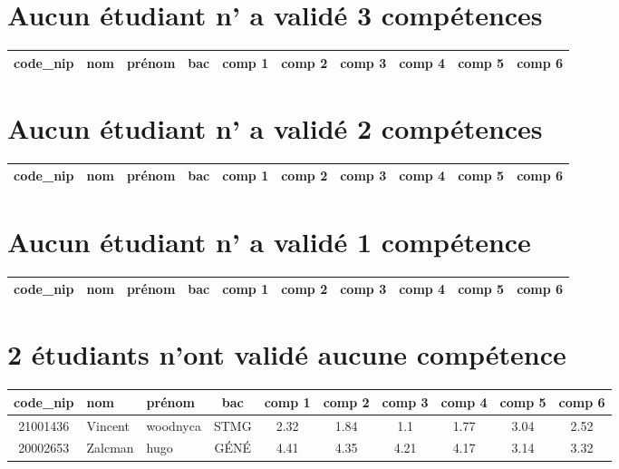 \documentclass{article}%
\begin{document}
%
\section*{Aucun étudiant n' a validé 3 compétences}%
\label{sec:Aucuntudiantnavalid3comptences}%
\begin{tabular}{|c|l|l|c|c|c|c|c|c|c|}%
\hline%
\rowcolor{vert}%
code\_nip&nom&prénom&bac&comp 1&comp 2&comp 3&comp 4&comp 5&comp 6\\%
\hline%
\end{tabular}

%
\section*{Aucun étudiant n' a validé 2 compétences}%
\label{sec:Aucuntudiantnavalid2comptences}%
\begin{tabular}{|c|l|l|c|c|c|c|c|c|c|}%
\hline%
\rowcolor{vert}%
code\_nip&nom&prénom&bac&comp 1&comp 2&comp 3&comp 4&comp 5&comp 6\\%
\hline%
\end{tabular}

%
\section*{Aucun étudiant n' a validé 1 compétence}%
\label{sec:Aucuntudiantnavalid1comptence}%
\begin{tabular}{|c|l|l|c|c|c|c|c|c|c|}%
\hline%
\rowcolor{vert}%
code\_nip&nom&prénom&bac&comp 1&comp 2&comp 3&comp 4&comp 5&comp 6\\%
\hline%
\end{tabular}

%
\section*{2 étudiants n'ont validé aucune compétence}%
\label{sec:2tudiantsnontvalidaucunecomptence}%
\begin{tabular}{|c|l|l|c|c|c|c|c|c|c|}%
\hline%
\rowcolor{vert}%
code\_nip&nom&prénom&bac&comp 1&comp 2&comp 3&comp 4&comp 5&comp 6\\%
\hline%
21001436&Vincent&woodnyca&STMG&2.32&1.84&1.1&1.77&3.04&2.52\\%
\hline%
20002653&Zalcman&hugo&GÉNÉ&4.41&4.35&4.21&4.17&3.14&3.32\\%
\hline%
\end{tabular}

%
\end{document}
